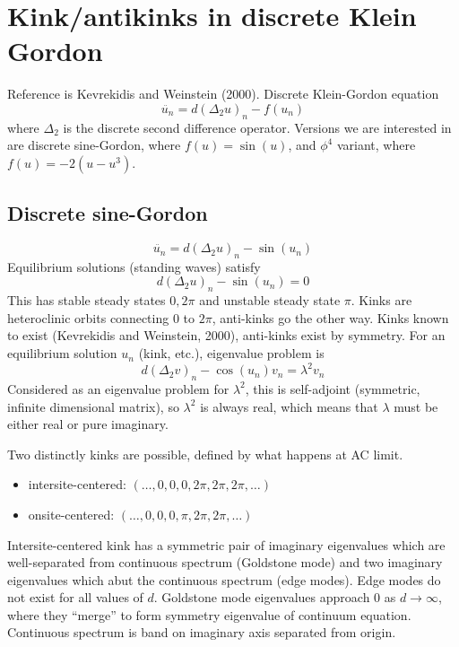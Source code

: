 \documentclass[12pt]{article}
\begin{document}
\section{Kink/antikinks in discrete Klein Gordon}

Reference is Kevrekidis and Weinstein (2000). Discrete Klein-Gordon equation
\[
\ddot{u_n} = d (\Delta_2 u)_n - f(u_n)
\]
where $\Delta_2$ is the discrete second difference operator. Versions we are interested in are discrete sine-Gordon, where $f(u) = \sin(u)$, and $\phi^4$ variant, where $f(u) = -2(u-u^3)$.

\subsection{Discrete sine-Gordon}
\[
\ddot{u_n} = d (\Delta_2 u)_n - \sin(u_n)
\]
Equilibrium solutions (standing waves) satisfy 
\[
d (\Delta_2 u)_n - \sin(u_n) = 0
\]
This has stable steady states $0, 2 \pi$ and unstable steady state $\pi$. Kinks are heteroclinic orbits connecting 0 to $2 \pi$, anti-kinks go the other way. Kinks known to exist (Kevrekidis and Weinstein, 2000), anti-kinks exist by symmetry. For an equilibrium solution $u_n$ (kink, etc.), eigenvalue problem is 
\[
d (\Delta_2 v)_n - \cos(u_n)v_n = \lambda^2 v_n
\]
Considered as an eigenvalue problem for $\lambda^2$, this is self-adjoint (symmetric, infinite dimensional matrix), so $\lambda^2$ is always real, which means that $\lambda$ must be either real or pure imaginary. 

Two distinctly kinks are possible, defined by what happens at AC limit.
\begin{itemize}
	\item intersite-centered: $(\dots, 0,0,0,2\pi,2\pi,2\pi,\dots)$
	\item onsite-centered: $(\dots, 0,0,0,\pi,2\pi,2\pi,\dots)$
\end{itemize}
Intersite-centered kink has a symmetric pair of imaginary eigenvalues which are well-separated from continuous spectrum (Goldstone mode) and two imaginary eigenvalues which abut the continuous spectrum (edge modes). Edge modes do not exist for all values of $d$. Goldstone mode eigenvalues approach 0 as $d \rightarrow \infty$, where they ``merge'' to form symmetry eigenvalue of continuum equation. Continuous spectrum is band on imaginary axis separated from origin.
\end{document}
